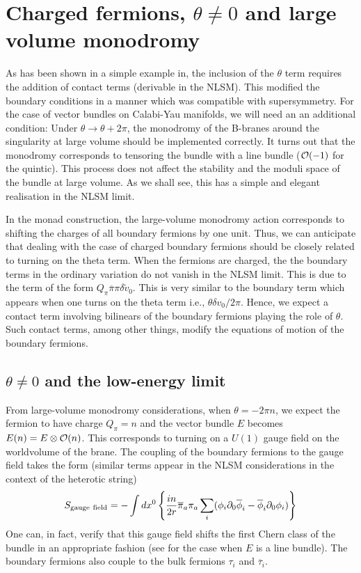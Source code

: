 \documentclass[a4paper,12pt]{article}
\begin{document}
\section{Charged fermions, $\theta\neq0$ and large volume monodromy}
\label{seclvmon}


As has been shown in a simple example in\cite{lsmone,HIV}, the inclusion of the
$\theta$ term
requires the addition of contact terms (derivable in the NLSM).
This modified the boundary conditions in a manner which was compatible
with supersymmetry. For
the case of vector bundles on Calabi-Yau manifolds, we will need an
an additional condition: Under $\theta\rightarrow \theta+2\pi$, the
monodromy of the B-branes around the singularity at large volume
should be implemented correctly. It turns out
that the monodromy corresponds to tensoring the bundle with a
line bundle (${\cal O}(-1)$ for the quintic). This process does not
affect the stability and the moduli space of the bundle at large volume.
As we shall see, this has a simple and elegant realisation in the
NLSM limit. 

In the monad construction, the large-volume monodromy action
corresponds to shifting the charges of all boundary fermions by one
unit. Thus, we can anticipate that dealing with the case of charged
boundary fermions should be closely related to turning on the theta
term.
When the fermions are charged, the 
the boundary terms in the ordinary variation do not vanish 
in the NLSM limit. This is
due to the term of the form $Q_\pi\overline{\pi}\pi \delta \widetilde{v}_0$.
This is very similar to the boundary term which appears when
one turns on the theta term i.e., $\theta\delta v_0/2\pi$. Hence,
we expect a contact term involving bilinears of the boundary fermions
playing the role of $\theta$. Such contact terms, among other things,
modify the equations of motion of the boundary fermions.

\subsection{$\theta\neq0$ and the low-energy limit}

{}From large-volume monodromy considerations, when $\theta=-2\pi n$,
we expect the fermion to have charge $Q_\pi=n$ and the vector 
bundle $E$ becomes $E(n)=E\otimes {\cal O}(n)$. This corresponds to
turning on a $U(1)$
gauge field on the worldvolume of the brane. The 
coupling of the boundary fermions to the gauge field
takes the form (similar terms appear in the NLSM 
considerations in the context of the heterotic string\cite{callanreview})
\begin{equation}
S_{\rm gauge~field}= -\int dx^0\left\{ {{in}\over{2 r}} \overline{\pi}_a
\pi_a \sum_i (\phi_i \partial_0\overline{\phi}_i - \overline{\phi}_i
\partial_0 \phi_i) \right\}
\end{equation}
One can, in fact,  verify that this gauge field shifts the first Chern
class of the bundle in an appropriate fashion (see \cite{HIV} for
the case when $E$ is a line bundle). The boundary fermions 
also couple to the bulk fermions $\tau_i$ and $\overline{\tau}_i$.
\end{document}
